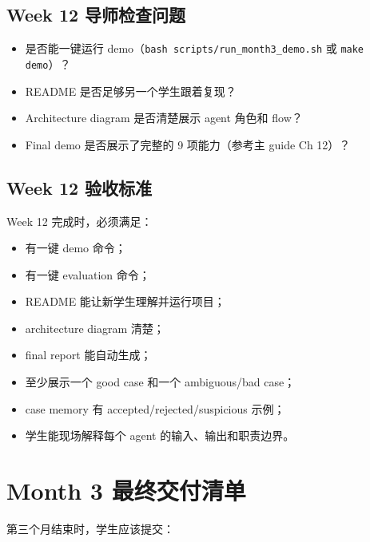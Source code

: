 \documentclass[11pt,a4paper,fontset=none]{ctexart}
\begin{document}
\subsection{Week 12 导师检查问题}
\begin{itemize}[leftmargin=2em]
  \item 是否能一键运行 demo（\texttt{bash scripts/run\_month3\_demo.sh} 或 \texttt{make demo}）？
  \item README 是否足够另一个学生跟着复现？
  \item Architecture diagram 是否清楚展示 agent 角色和 flow？
  \item Final demo 是否展示了完整的 9 项能力（参考主 guide Ch 12）？
\end{itemize}

\subsection{Week 12 验收标准}

Week 12 完成时，必须满足：

\begin{itemize}[leftmargin=2em]
  \item 有一键 demo 命令；
  \item 有一键 evaluation 命令；
  \item README 能让新学生理解并运行项目；
  \item architecture diagram 清楚；
  \item final report 能自动生成；
  \item 至少展示一个 good case 和一个 ambiguous/bad case；
  \item case memory 有 accepted/rejected/suspicious 示例；
  \item 学生能现场解释每个 agent 的输入、输出和职责边界。
\end{itemize}

\newpage

\section{Month 3 最终交付清单}

第三个月结束时，学生应该提交：
\end{document}
